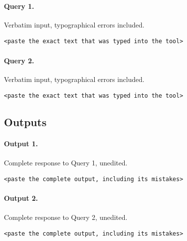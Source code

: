 \paragraph{Query 1.} Verbatim input, typographical errors included.
\begin{lstlisting}[style=aiquote]
<paste the exact text that was typed into the tool>
\end{lstlisting}

\paragraph{Query 2.} Verbatim input, typographical errors included.
\begin{lstlisting}[style=aiquote]
<paste the exact text that was typed into the tool>
\end{lstlisting}

\subsection{Outputs}
\label{sec:ai-outputs}

\paragraph{Output 1.} Complete response to Query 1, unedited.
\begin{lstlisting}[style=aiquote]
<paste the complete output, including its mistakes>
\end{lstlisting}

\paragraph{Output 2.} Complete response to Query 2, unedited.
\begin{lstlisting}[style=aiquote]
<paste the complete output, including its mistakes>
\end{lstlisting}
